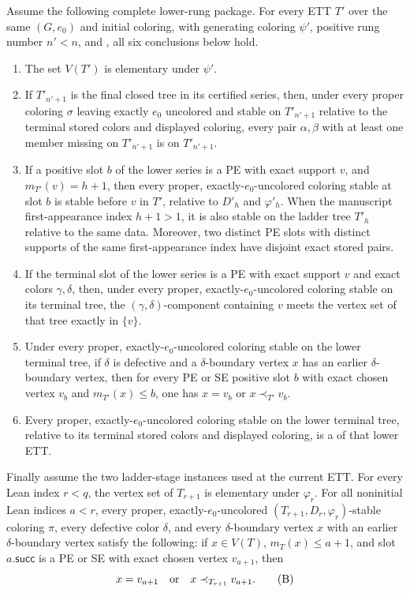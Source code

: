 \begin{lemma}
Assume the following complete lower-rung package.  For every ETT \(T'\)
over the same \((G,e_0)\) and initial coloring, with generating coloring
\(\psi'\), positive rung number \(n'<n\), and
, all six conclusions below hold.
\begin{enumerate}
\item The set \(V(T')\) is elementary under \(\psi'\).
\item If \(T'_{n'+1}\) is the final closed tree in its certified series,
      then, under every proper coloring \(\sigma\) leaving exactly
      \(e_0\) uncolored and stable on \(T'_{n'+1}\) relative to the
      terminal stored colors and displayed coloring, every pair
      \(\alpha,\beta\) with at least one member missing on
      \(T'_{n'+1}\) is
       on \(T'_{n'+1}\).
\item If a positive slot \(b\) of the lower series is a PE with exact
      support \(v\), and \(m_{T'}(v)=h+1\), then every proper,
      exactly-\(e_0\)-uncolored coloring stable at slot \(b\) is stable
      before \(v\) in \(T'\), relative to \(D'_h\) and \(\varphi'_h\).
      When the manuscript first-appearance index \(h+1>1\), it is also
      stable on the ladder tree \(T'_h\) relative to the same data.
      Moreover, two distinct PE
      slots with distinct supports of the same first-appearance index
      have disjoint exact stored pairs.
\item If the terminal slot of the lower series is a PE with exact support
      \(v\) and exact colors \(\gamma,\delta\), then, under every proper,
      exactly-\(e_0\)-uncolored coloring stable on its terminal tree, the
      \((\gamma,\delta)\)-component containing \(v\) meets the vertex set
      of that tree exactly in \(\{v\}\).
\item Under every proper, exactly-\(e_0\)-uncolored coloring stable on the
      lower terminal tree, if \(\delta\) is defective and a
      \(\delta\)-boundary vertex \(x\) has an earlier
      \(\delta\)-boundary vertex, then for every PE or SE positive slot
      \(b\) with exact chosen vertex \(v_b\) and
      \(m_{T'}(x)\leq b\), one has
      \(x=v_b\) or \(x\prec_{T'}v_b\).
\item Every proper, exactly-\(e_0\)-uncolored coloring stable on the lower
      terminal tree, relative to its terminal stored colors and displayed
      coloring, is a  of that lower ETT.
\end{enumerate}

Finally assume the two ladder-stage instances used at the current ETT.
For every Lean index \(r<q\), the vertex set of \(T_{r+1}\) is elementary
under \(\varphi_r\).  For all noninitial Lean indices \(a<r\), every
proper, exactly-\(e_0\)-uncolored
\((T_{r+1},D_r,\varphi_r)\)-stable coloring \(\pi\), every defective
color \(\delta\), and every \(\delta\)-boundary vertex \(x\) with an
earlier \(\delta\)-boundary vertex satisfy the following: if
\(x\in V(T)\), \(m_T(x)\leq a+1\), and slot \(a.\mathsf{succ}\) is a PE
or SE with exact chosen vertex \(v_{a+1}\), then
\[
         x=v_{a+1}\quad\hbox{or}\quad x\prec_{T_{r+1}}v_{a+1}. \tag{B}
\]


\end{lemma}
